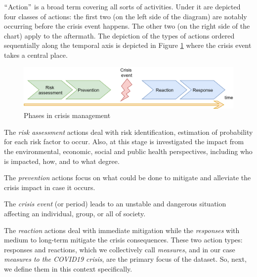 $``$Action$"$  is a broad term covering all sorts of activities. Under it are depicted four classes of actions: the first two (on the left side of the diagram) are notably occurring before the crisis event happens. The other two (on the right side of the chart) apply to the aftermath. The depiction of the types of actions ordered sequentially along the temporal axis is depicted in Figure \ref{fig:Phases_in_crisis_management} where the crisis event takes a central place. 

\begin{Center}

\begin{figure}[H]
	\begin{Center}
		\includegraphics[width=\textwidth]{images/image4.png}
		\caption{Phases in crisis management}
		\label{fig:Phases_in_crisis_management}
	\end{Center}
\end{figure}
\end{Center}

The \textit{risk assessment} actions deal with risk identification, estimation of probability for each risk factor to occur. Also, at this stage is investigated the impact from the environmental, economic, social and public health perspectives, including who is impacted, how, and to what degree. 

The \textit{prevention} actions focus on what could be done to mitigate and alleviate the crisis impact in case it occurs. 

The \textit{crisis event} (or period) leads to an unstable and dangerous situation affecting an individual, group, or all of society. 

The \textit{reaction} actions deal with immediate mitigation while the \textit{responses} with medium to long-term mitigate the crisis consequences. These two action types: responses and reactions, which we collectively call \textit{measures}, and in our case \textit{measures to the COVID19 crisis}, are the primary focus of the dataset. So, next, we define them in this context specifically. 

